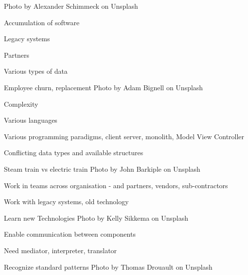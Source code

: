 \documentclass[Screen16to9,17pt]{foils}
\begin{document}
\hfill Photo by Alexander Schimmeck on Unsplash




\begin{list2}
\item Accumulation of software
\item Legacy systems
\item Partners
\item Various types of data
\item Employee churn, replacement \hfill Photo by Adam Bignell on Unsplash
\end{list2}





\begin{list2}
\item Complexity
\item Various languages
\item Various programming paradigms, client server, monolith, Model View Controller
\item Conflicting data types and available structures
\item Steam train vs electric train \hfill Photo by John Barkiple on Unsplash

\end{list2}






\begin{list2}
\item Work in teams across organisation - and partners, vendors, sub-contractors
\item Work with legacy systems, old technology
\item Learn new Technologies \hfill Photo by Kelly Sikkema on Unsplash
\end{list2}







\begin{list2}
\item Enable communication between components
\item Need mediator, interpreter, translator
\item Recognize standard patterns \hfill Photo by Thomas Drouault on Unsplash
\end{list2}
\end{document}
